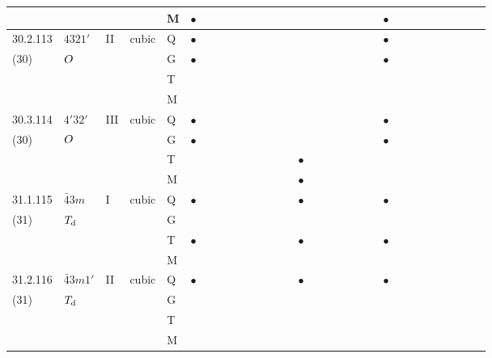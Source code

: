 \documentclass[fleqn,9pt,landscape]{jsarticle}
\begin{document}
\begin{longtable}{lllll|l|lll|ll|lll|l|lll|lll|l|ll|lll|lll}
 &  &  &  & M & $\bullet$ &  &  &  &  &  &  &  &  &  &  &  &  &  &  &  & $\bullet$ &  &  &  &  &  &  &  &  \\ \hline
30.2.113 & \texttt{$4321'$} & II & cubic & Q & $\bullet$ &  &  &  &  &  &  &  &  &  &  &  &  &  &  &  & $\bullet$ &  &  &  &  &  &  &  &  \\
(30) & $O_{\rm }$ &  &  & G & $\bullet$ &  &  &  &  &  &  &  &  &  &  &  &  &  &  &  & $\bullet$ &  &  &  &  &  &  &  &  \\
 &  &  &  & T &  &  &  &  &  &  &  &  &  &  &  &  &  &  &  &  &  &  &  &  &  &  &  &  &  \\
 &  &  &  & M &  &  &  &  &  &  &  &  &  &  &  &  &  &  &  &  &  &  &  &  &  &  &  &  &  \\ \hline
30.3.114 & \texttt{$4'32'$} & III & cubic & Q & $\bullet$ &  &  &  &  &  &  &  &  &  &  &  &  &  &  &  & $\bullet$ &  &  &  &  &  &  &  &  \\
(30) & $O_{\rm }$ &  &  & G & $\bullet$ &  &  &  &  &  &  &  &  &  &  &  &  &  &  &  & $\bullet$ &  &  &  &  &  &  &  &  \\
 &  &  &  & T &  &  &  &  &  &  &  &  &  & $\bullet$ &  &  &  &  &  &  &  &  &  &  &  &  &  &  &  \\
 &  &  &  & M &  &  &  &  &  &  &  &  &  & $\bullet$ &  &  &  &  &  &  &  &  &  &  &  &  &  &  &  \\ \hline
31.1.115 & \texttt{$\bar{4}3m$} & I & cubic & Q & $\bullet$ &  &  &  &  &  &  &  &  & $\bullet$ &  &  &  &  &  &  & $\bullet$ &  &  &  &  &  &  &  &  \\
(31) & $T_{\rm d}$ &  &  & G &  &  &  &  &  &  &  &  &  &  &  &  &  &  &  &  &  &  &  &  &  &  &  &  &  \\
 &  &  &  & T & $\bullet$ &  &  &  &  &  &  &  &  & $\bullet$ &  &  &  &  &  &  & $\bullet$ &  &  &  &  &  &  &  &  \\
 &  &  &  & M &  &  &  &  &  &  &  &  &  &  &  &  &  &  &  &  &  &  &  &  &  &  &  &  &  \\ \hline
31.2.116 & \texttt{$\bar{4}3m1'$} & II & cubic & Q & $\bullet$ &  &  &  &  &  &  &  &  & $\bullet$ &  &  &  &  &  &  & $\bullet$ &  &  &  &  &  &  &  &  \\
(31) & $T_{\rm d}$ &  &  & G &  &  &  &  &  &  &  &  &  &  &  &  &  &  &  &  &  &  &  &  &  &  &  &  &  \\
 &  &  &  & T &  &  &  &  &  &  &  &  &  &  &  &  &  &  &  &  &  &  &  &  &  &  &  &  &  \\
 &  &  &  & M &  &  &  &  &  &  &  &  &  &  &  &  &  &  &  &  &  &  &  &  &  &  &  &  &  \\ \hline

\end{longtable}
\end{document}
